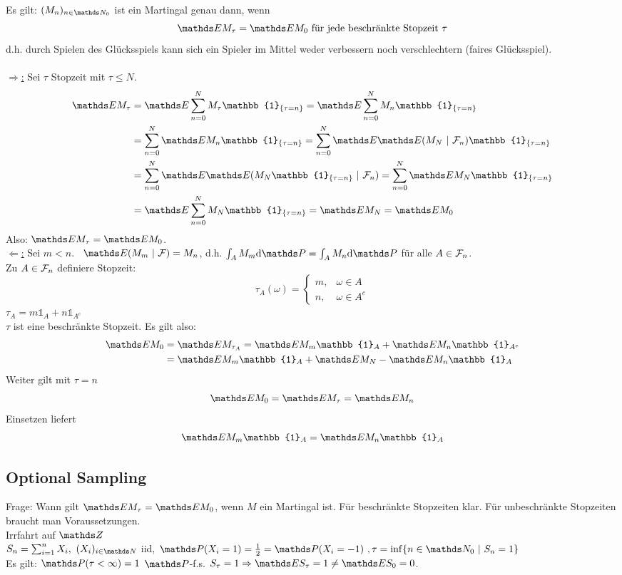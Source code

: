 Es gilt: $(M_n)_{n\in \N_0}$ ist ein Martingal genau dann, wenn 
\[
\E M_{\tau}=\E M_0 \text{ für jede beschränkte Stopzeit }\tau 
\]
d.h. durch Spielen des Glücksspiels kann sich ein Spieler im Mittel weder verbessern noch verschlechtern (faires Glücksspiel).\\

\\
\uline{$\Rightarrow$:} 
Sei $\tau$ Stopzeit mit $\tau\le N$.
\begin{equation*}
\begin{aligned}
	\E M_\tau &=\E \sum_{n=0}^{N}M_\tau \mathbb{1}_{\{\tau=n\}}= \E \sum_{n=0}^{N}M_n \mathbb{1}_{\{\tau=n\}}\\ 
	&=\sum_{n=0}^{N}\E M_n \mathbb{1}_{\{\tau=n\}}= \sum_{n=0}^{N}\E\E(M_N~|~\F_n) \mathbb{1}_{\{\tau=n\}}\\
	&= \sum_{n=0}^{N}\E\E(M_N\mathbb{1}_{\{\tau=n\}}~|~\F_n)= \sum_{n=0}^{N}\E M_N\mathbb{1}_{\{\tau=n\}}\\
	&=\E\sum_{n=0}^{N}M_N \mathbb{1}_{\{\tau=n\}}= \E M_N= \E M_0
\end{aligned}
\end{equation*}
Also: $\E M_\tau=\E M_0$.\\

\uline{$\Leftarrow$:} 
Sei $m<n$. 
\zz~$\E(M_m~|~\F)=M_n$, d.h. $\int_A M_m\dint \Pw = \int_A M_n\dint\Pw$ für alle $A\in \mathcal{F}_n$.\\
Zu $A\in \mathcal{F}_n$ definiere Stopzeit:
\[
\tau_A(\omega)=\left\{\begin{array}{cl}  m, & \omega\in A\\ n, & \omega \in A^c   \end{array}\right. 
\]
$\tau_A=m\mathbb{1}_A+n\mathbb{1}_{A^c}$\\
$\tau$ ist eine beschränkte Stopzeit. 
Es gilt also:
\begin{equation*}
\begin{aligned}
	\E M_0 &=\E M_{\tau_A}= \E M_m\mathbb{1}_A+ \E M_n \mathbb{1}_{A^c}\\
	&= \E  M_m\mathbb{1}_A+ \E M_N- \E M_n \mathbb{1}_{A}
\end{aligned}
\end{equation*}
Weiter gilt mit $\tau = n$ 
\[
\E M_0=\E M_\tau =\E M_n 
\]
Einsetzen  liefert 
\[
\E M_m\mathbb{1}_A=\E M_n\mathbb{1}_A 
\]

\subsection{Optional Sampling}
\label{sub:opt_sampling}
Frage: Wann gilt $\E M_\tau=\E M_0$, wenn $M$ ein Martingal ist. 
Für beschränkte Stopzeiten klar. 
Für unbeschränkte Stopzeiten braucht man Voraussetzungen.\\
 Irrfahrt auf $\Z$\\
$S_n=\sum_{i=1}^{n}X_i,~ (X_i)_{i\in \N}$ iid, $\Pw(X_i=1)=\frac{1}{2}=\Pw(X_i=-1)~, \tau=\inf\{n\in \N_0~|~S_n=1\}$\\
Es gilt: $\Pw(\tau<\infty)=1$ $\Pw$-f.s. $S_\tau=1\Rightarrow \E S_\tau=1\not=\E S_0=0$.

